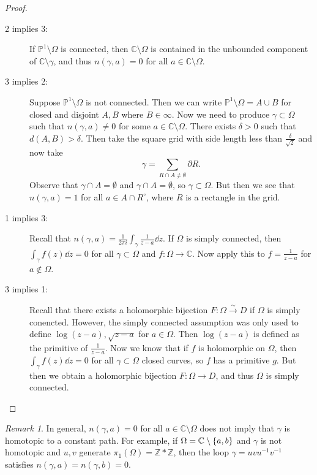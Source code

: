 \documentclass[leqno, openany]{memoir}
\theoremstyle{definition}
\theoremstyle{remark}
\newtheorem{rmk}[thm]{Remark}
\theoremstyle{plain}
\theoremstyle{definition}
\theoremstyle{remark}
\newcommand{\C}{\mathbb{C}}
\newcommand{\Z}{\mathbb{Z}}
\renewcommand{\P}{\mathbb{P}}
\begin{document}
\begin{proof}\leavevmode \begin{description} \item[2 implies 3:] If $\P^1
    \setminus \Omega$ is connected, then $\C \setminus \Omega$ is contained in
    the unbounded component of $\C \setminus \gamma$, and thus $n(\gamma, a) =
    0$ for all $a \in \C \setminus \Omega$.  \item[3 implies 2:] Suppose $\P^1
    \setminus \Omega$ is not connected. Then we can write $\P^1 \setminus
    \Omega = A \cup B$ for closed and disjoint $A, B$ where $B \in \infty$. Now
    we need to produce $\gamma \subset \Omega$ such that $n(\gamma, a) \neq 0$
    for some $a \in \C \setminus \Omega$. There exists $\delta > 0$ such that
    $d(A,B) > \delta$. Then take the square grid with side length less than
    $\frac{\delta}{\sqrt{2}}$ and now take \[ \gamma = \sum_{R \cap A \neq
    \emptyset} \partial R. \] Observe that $\gamma \cap A = \emptyset$ and
    $\gamma \cap A = \emptyset$, so $\gamma \subset \Omega$. But then we see
    that $n(\gamma, a) = 1$ for all $a \in A \cap R^{\circ}$, where $R$ is a
    rectangle in the grid.  \item[1 implies 3:] Recall that $n(\gamma, a) =
    \frac{1}{2 \pi i} \int_{\gamma} \frac{1}{z-a} \dd{z}$. If $\Omega$ is
    simply connected, then $\int_{\gamma} f(z) \dd{z} = 0$ for all $\gamma
    \subset \Omega$ and $f \colon \Omega \to \C$. Now apply this to $f =
    \frac{1}{z-a}$ for $a \notin \Omega$.  \item[3 implies 1:] Recall that
    there exists a holomorphic bijection $F \colon \Omega \xrightarrow{\sim} D$
    if $\Omega$ is simply conencted. However, the simply connected assumption
    was only used to define $\log(z-a), \sqrt{z-a}$ for $a \in \Omega$. Then
    $\log (z-a)$ is defined as the primitive of $\frac{1}{z-a}$. Now we know
    that if $f$ is holomorphic on $\Omega$, then $\int_{\gamma} f(z) \dd{z} =
    0$ for all $\gamma \subset \Omega$ closed curves, so $f$ has a primitive
    $g$. But then we obtain a holomorphic bijection $F \colon \Omega \to D$,
    and thus $\Omega$ is simply connected. \qedhere \end{description}
\end{proof}

\begin{rmk} In general, $n(\gamma, a) = 0$ for all $a \in \C \setminus \Omega$
    does not imply that $\gamma$ is homotopic to a constant path. For example,
    if $\Omega = \C \setminus \qty{a,b}$ and $\gamma$ is not homotopic and
    $u,v$ generate $\pi_1(\Omega) = \Z * \Z$, then the loop $\gamma =
    uvu^{-1}v^{-1}$ satisfies $n(\gamma, a) = n(\gamma, b) = 0$.  \end{rmk}
\end{document}
